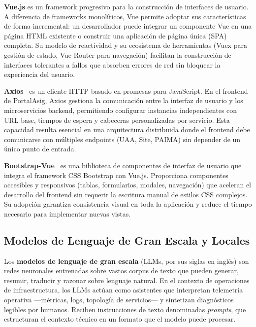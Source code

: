 \textbf{Vue.js} \cite{vue2024} es un framework progresivo para la construcci\'{o}n de interfaces de usuario. A diferencia de frameworks monol\'{i}ticos, Vue permite adoptar sus caracter\'{i}sticas de forma incremental: un desarrollador puede integrar un componente Vue en una p\'{a}gina HTML existente o construir una aplicaci\'{o}n de p\'{a}gina \'{u}nica (SPA) completa. Su modelo de reactividad y su ecosistema de herramientas (Vuex para gesti\'{o}n de estado, Vue Router para navegaci\'{o}n) facilitan la construcci\'{o}n de interfaces tolerantes a fallos que absorben errores de red sin bloquear la experiencia del usuario.

\textbf{Axios}~\cite{axios2024} es un cliente HTTP basado en promesas para JavaScript. En el frontend de PortalAsig, Axios gestiona la comunicaci\'{o}n entre la interfaz de usuario y los microservicios backend, permitiendo configurar instancias independientes con URL base, tiempos de espera y cabeceras personalizadas por servicio. Esta capacidad resulta esencial en una arquitectura distribuida donde el frontend debe comunicarse con m\'{u}ltiples endpoints (UAA, Site, PAIMA) sin depender de un \'{u}nico punto de entrada.

\textbf{Bootstrap-Vue}~\cite{bootstrapvue2024} es una biblioteca de componentes de interfaz de usuario que integra el framework CSS Bootstrap con Vue.js. Proporciona componentes accesibles y responsivos (tablas, formularios, modales, navegaci\'{o}n) que aceleran el desarrollo del frontend sin requerir la escritura manual de estilos CSS complejos. Su adopci\'{o}n garantiza consistencia visual en toda la aplicaci\'{o}n y reduce el tiempo necesario para implementar nuevas vistas.

\subsection{Modelos de Lenguaje de Gran Escala y Locales}

Los \textbf{modelos de lenguaje de gran escala} (LLMs, por sus siglas en ingl\'{e}s) son redes neuronales entrenadas sobre vastos corpus de texto que pueden generar, resumir, traducir y razonar sobre lenguaje natural. En el contexto de operaciones de infraestructura, los LLMs act\'{u}an como asistentes que interpretan telemetr\'{i}a operativa ---m\'{e}tricas, logs, topolog\'{i}a de servicios--- y sintetizan diagn\'{o}sticos legibles por humanos. Reciben instrucciones de texto denominadas \textit{prompts}, que estructuran el contexto t\'{e}cnico en un formato que el modelo puede procesar.

